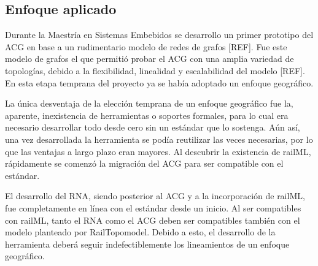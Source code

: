 \subsection{Enfoque aplicado}

    Durante la Maestría en Sistemas Embebidos se desarrollo un primer prototipo del ACG en base a un rudimentario modelo de redes de grafos [REF]. Fue este modelo de grafos el que permitió probar el ACG con una amplia variedad de topologías, debido a la flexibilidad, linealidad y escalabilidad del modelo [REF]. En esta etapa temprana del proyecto ya se había adoptado un enfoque geográfico.

    La única desventaja de la elección temprana de un enfoque geográfico fue la, aparente, inexistencia de herramientas o soportes formales, para lo cual era necesario desarrollar todo desde cero sin un estándar que lo sostenga. Aún así, una vez desarrollada la herramienta se podía reutilizar las veces necesarias, por lo que las ventajas a largo plazo eran mayores. Al descubrir la existencia de railML, rápidamente se comenzó la migración del ACG para ser compatible con el estándar.

    El desarrollo del RNA, siendo posterior al ACG y a la incorporación de railML, fue completamente en línea con el estándar desde un inicio. Al ser compatibles con railML, tanto el RNA como el ACG deben ser compatibles también con el modelo planteado por RailTopomodel. Debido a esto, el desarrollo de la herramienta deberá seguir indefectiblemente los lineamientos de un enfoque geográfico. 